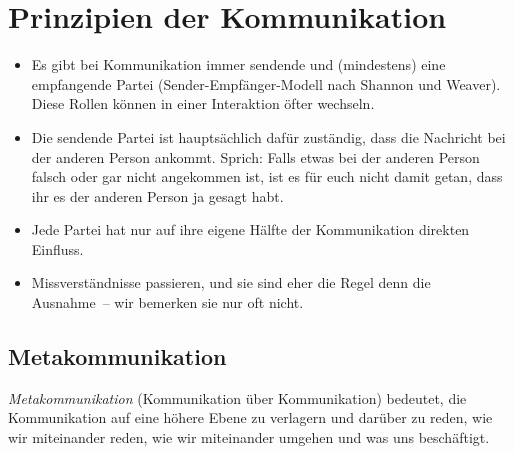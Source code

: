 \section{Prinzipien der Kommunikation}
\label{kommunikationsprinzipien}

\begin{itemize}
  \item Es gibt bei Kommunikation immer sendende und (mindestens) eine empfangende Partei (Sender-Empfänger-Modell nach Shannon und Weaver). Diese Rollen können in einer Interaktion öfter wechseln.
  \item Die sendende Partei ist hauptsächlich dafür zuständig, dass die Nachricht bei der anderen Person ankommt. Sprich: Falls etwas bei der anderen Person falsch oder gar nicht angekommen ist, ist es für euch nicht damit getan, dass ihr es der anderen Person \glqq ja gesagt habt\grqq.
  \item Jede Partei hat nur auf ihre eigene Hälfte der Kommunikation direkten Einfluss.
  \item Missverständnisse passieren, und sie sind eher die Regel denn die Ausnahme~-- wir bemerken sie nur oft nicht.
\end{itemize}


\subsection{Metakommunikation}
\label{metakommunikation}

\emph{Metakommunikation} (\glqq Kommunikation über Kommunikation\grqq) bedeutet, die Kommunikation auf eine höhere Ebene zu verlagern und darüber zu reden, wie wir miteinander reden, wie wir miteinander umgehen und was uns beschäftigt.
